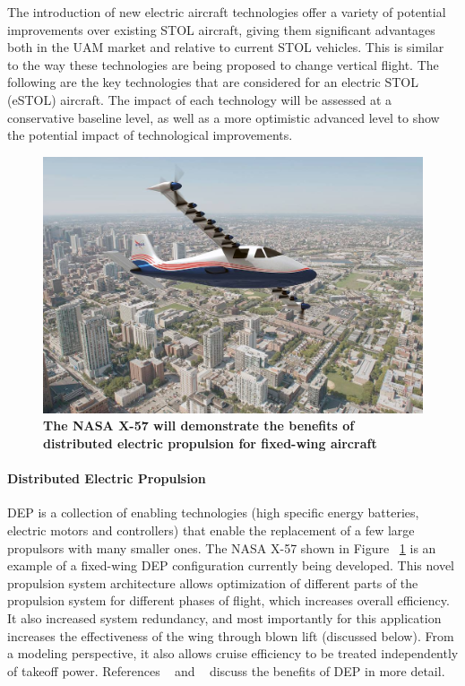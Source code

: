 \documentclass[]{aiaa-tc}%
\begin{document}
The introduction of new electric aircraft technologies offer a variety of potential improvements over existing STOL aircraft, giving them significant advantages both in the UAM market and relative to current STOL vehicles.  This is similar to the way these technologies are being proposed to change vertical flight.  The following are the key technologies that are considered for an electric STOL (eSTOL) aircraft.  The impact of each technology will be assessed at a conservative baseline level, as well as a more optimistic advanced level to show the potential impact of technological improvements.  
\begin{figure}
	\begin{center}
	\includegraphics{x-57.jpg}
    \caption{\textbf{The NASA X-57 will demonstrate the benefits of distributed electric propulsion for fixed-wing aircraft ~\cite{NASAWeb}}}
	\label{f:x57}
	\end{center}
\end{figure}
\paragraph{Distributed Electric Propulsion}
DEP is a collection of enabling technologies (high specific energy batteries, electric motors and controllers) that enable the replacement of a few large propulsors with many smaller ones.  The NASA X-57 shown in Figure ~\ref{f:x57} is an example of a fixed-wing DEP configuration currently being developed.   This novel propulsion system architecture allows optimization of different parts of the propulsion system for different phases of flight, which increases overall efficiency.  It also increased system redundancy, and most importantly for this application increases the effectiveness of the wing through blown lift (discussed below).  From a modeling perspective, it also allows cruise efficiency to be treated independently of takeoff power.  References ~\cite{StollDEP} and ~\cite{MooreDEP} discuss the benefits of DEP in more detail. 
\end{document}
